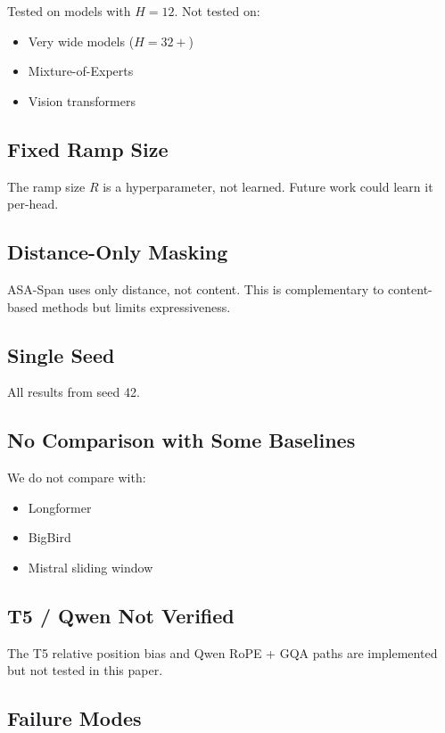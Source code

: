 Tested on models with $H = 12$. Not tested on:
\begin{itemize}
\item Very wide models ($H = 32+$)
\item Mixture-of-Experts
\item Vision transformers

\end{itemize}
\subsection{Fixed Ramp Size}

The ramp size $R$ is a hyperparameter, not learned. Future work could learn 
it per-head.

\subsection{Distance-Only Masking}

ASA-Span uses only distance, not content. This is complementary to 
content-based methods but limits expressiveness.

\subsection{Single Seed}

All results from seed 42.

\subsection{No Comparison with Some Baselines}

We do not compare with:
\begin{itemize}
\item Longformer
\item BigBird
\item Mistral sliding window

\end{itemize}
\subsection{T5 / Qwen Not Verified}

The T5 relative position bias and Qwen RoPE + GQA paths are implemented but 
not tested in this paper.

\subsection{Failure Modes}


